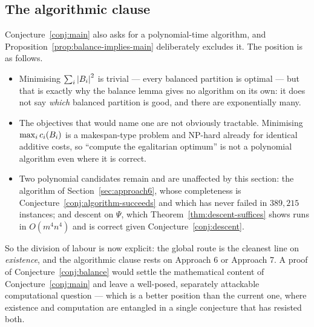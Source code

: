 \subsection{The algorithmic clause}
\label{sec:approach8-algorithmic}

Conjecture~\ref{conj:main} also asks for a polynomial-time algorithm, and
Proposition~\ref{prop:balance-implies-main} deliberately excludes it. The
position is as follows.

\begin{itemize}
  \item Minimising $\sum_i \left\lvert B_i\right\rvert^2$ is trivial --- every balanced partition
    is optimal --- but that is exactly why the balance lemma gives no algorithm
    on its own: it does not say \emph{which} balanced partition is good, and
    there are exponentially many.
  \item The objectives that would name one are not obviously tractable.
    Minimising $\max_i c_i(B_i)$ is a makespan-type problem and NP-hard
    already for identical additive costs, so ``compute the egalitarian optimum''
    is not a polynomial algorithm even where it is correct.
  \item Two polynomial candidates remain and are unaffected by this section: the
    algorithm of Section~\ref{sec:approach6}, whose completeness is
    Conjecture~\ref{conj:algorithm-succeeds} and which has never failed in
    $389{,}215$ instances; and descent on $\Psi$, which
    Theorem~\ref{thm:descent-suffices} shows runs in $O(m^4 n^4)$ and is correct
    given Conjecture~\ref{conj:descent}.
\end{itemize}

So the division of labour is now explicit: the global route is the cleanest line
on \emph{existence}, and the algorithmic clause rests on Approach 6 or Approach
7. A proof of Conjecture~\ref{conj:balance} would settle the mathematical
content of Conjecture~\ref{conj:main} and leave a well-posed, separately
attackable computational question --- which is a better position than the
current one, where existence and computation are entangled in a single
conjecture that has resisted both.
